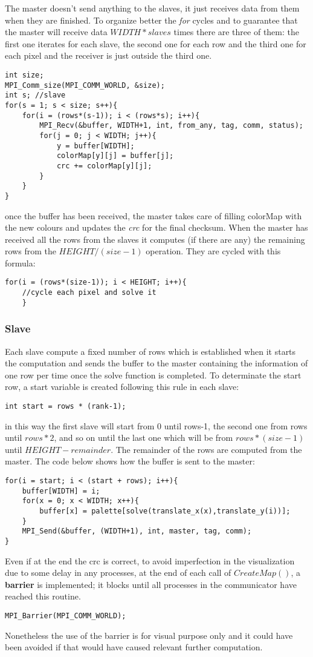 \documentclass[11pt,conference]{IEEEtran}
\begin{document}
The master doesn't send anything to the slaves, it just receives data from them when they are finished. To organize better the \textit{for} cycles and to guarantee that the master will receive data $WIDTH * slaves$ times there are three of them: the first one iterates for each slave, the second one for each row and the third one for each pixel and the receiver is just outside the third one.
\begin{lstlisting}
int size;
MPI_Comm_size(MPI_COMM_WORLD, &size);
int s; //slave
for(s = 1; s < size; s++){
	for(i = (rows*(s-1)); i < (rows*s); i++){
		MPI_Recv(&buffer, WIDTH+1, int, from_any, tag, comm, status);
		for(j = 0; j < WIDTH; j++){
			y = buffer[WIDTH];
			colorMap[y][j] = buffer[j];
			crc += colorMap[y][j];
		}
	}
}
\end{lstlisting}
once the buffer has been received, the master takes care of filling colorMap with the new colours and updates the \textit{crc} for the final checksum.
When the master has received all the rows from the slaves it computes (if there are any) the remaining rows from the $HEIGHT / (size-1)$ operation. They are cycled with this formula:
\begin{lstlisting}
for(i = (rows*(size-1)); i < HEIGHT; i++){
	//cycle each pixel and solve it
	}
\end{lstlisting}

\subsubsection{\textbf{Slave}}
Each slave compute a fixed number of rows which is established when it starts the computation and sends the buffer to the master containing the information of one row per time once the solve function is completed.
To determinate the start row, a start variable is created following this rule in each slave:
\begin{lstlisting}
int start = rows * (rank-1);
\end{lstlisting}
in this way the first slave will start from 0 until rows-1, the second one from rows until $rows*2$, and so on until the last one which will be from $rows*(size-1)$ until $HEIGHT-remainder$. The remainder of the rows are computed from the master.
\newline
The code below shows how the buffer is sent to the master:
\begin{lstlisting}
for(i = start; i < (start + rows); i++){
	buffer[WIDTH] = i;
	for(x = 0; x < WIDTH; x++){
		buffer[x] = palette[solve(translate_x(x),translate_y(i))];
	}
	MPI_Send(&buffer, (WIDTH+1), int, master, tag, comm);
}
\end{lstlisting}
Even if at the end the crc is correct, to avoid imperfection in the visualization due to some delay in any processes, at the end of each call of $CreateMap()$, a \textbf{barrier} is implemented; it blocks until all processes in the communicator have reached this routine.
\begin{lstlisting}
MPI_Barrier(MPI_COMM_WORLD);
\end{lstlisting}
Nonetheless the use of the barrier is for visual purpose only and it could have been avoided if that would have caused relevant further computation.
\end{document}
